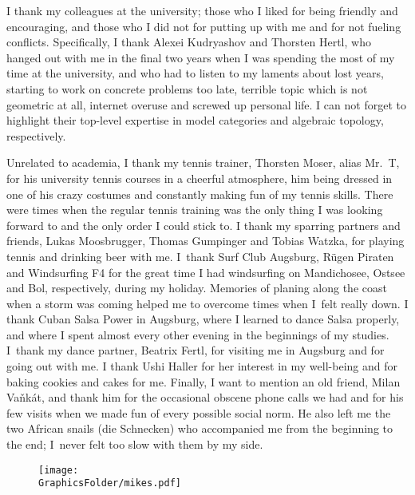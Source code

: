 \documentclass[\MainFolder/Text.tex]{subfiles}
\begin{document}
I thank my colleagues at the university; those who I liked for being friendly and encouraging, and those who I did not for putting up with me and for not fueling conflicts. Specifically, I thank Alexei Kudryashov and Thorsten Hertl, who hanged out with me in the final two years when I was spending the most of my time at the university, and who had to listen to my laments about lost years, starting to work on concrete problems too late, terrible topic which is not geometric at all, internet overuse and screwed up personal life. I can not forget to highlight their top-level expertise in model categories and algebraic topology, respectively.

Unrelated to academia, I thank my tennis trainer, Thorsten Moser, alias Mr.~T, for his university tennis courses in a cheerful atmosphere, him being dressed in one of his crazy costumes and constantly making fun of my tennis skills. There were times when the regular tennis training was the only thing I was looking forward to and the only order I could stick to. I thank my sparring partners and friends, Lukas Moosbrugger, Thomas Gumpinger and Tobias Watzka, for playing tennis and drinking beer with me. I~thank Surf Club Augsburg, R\"ugen Piraten and Windsurfing F4 for the great time I had windsurfing on Mandichosee, Ostsee and Bol, respectively, during my holiday. Memories of planing along the coast when a storm was coming helped me to overcome times when I~felt really down. I thank Cuban Salsa Power in Augsburg, where I learned to dance Salsa properly, and where I spent almost every other evening in the beginnings of my studies. I~thank my dance partner, Beatrix Fertl, for visiting me in Augsburg and for going out with me. I thank Ushi Haller for her interest in my well-being and for baking cookies and cakes for me. Finally, I want to mention an old friend, Milan Va\v nk\'at, and thank him for the occasional obscene phone calls we had and for his few visits when we made fun of every possible social norm. He also left me the two African snails (die Schnecken) who accompanied me from the beginning to the end; I~never felt too slow with them by my side.

\begin{figure}[!b]
\centering
\texttt{[image: \\GraphicsFolder/mikes.pdf]}
\end{figure}
%
\end{document}
